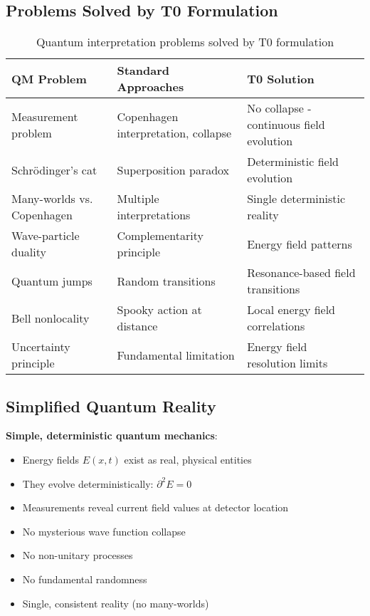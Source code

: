 \documentclass[12pt,a4paper]{article}
\newcommand{\Efield}{E}
\begin{document}
	\subsection{Problems Solved by T0 Formulation}
	
	\begin{table}[htbp]
		\centering
		\small
		\begin{tabular}{|p{4cm}|p{5cm}|p{6cm}|}
			\hline
			\textbf{QM Problem} & \textbf{Standard Approaches} & \textbf{T0 Solution} \\
			\hline
			Measurement problem & Copenhagen interpretation, collapse & No collapse - continuous field evolution \\
			\hline
			Schrödinger's cat & Superposition paradox & Deterministic field evolution \\
			\hline
			Many-worlds vs. Copenhagen & Multiple interpretations & Single deterministic reality \\
			\hline
			Wave-particle duality & Complementarity principle & Energy field patterns \\
			\hline
			Quantum jumps & Random transitions & Resonance-based field transitions \\
			\hline
			Bell nonlocality & Spooky action at distance & Local energy field correlations \\
			\hline
			Uncertainty principle & Fundamental limitation & Energy field resolution limits \\
			\hline
		\end{tabular}
		\caption{Quantum interpretation problems solved by T0 formulation}
	\end{table}
	
	\subsection{Simplified Quantum Reality}
	
	\begin{tcolorbox}[colback=green!5!white,colframe=green!75!black,title=T0 Quantum Reality]
		\textbf{Simple, deterministic quantum mechanics}:
		\begin{itemize}
			\item Energy fields $\Efield(x,t)$ exist as real, physical entities
			\item They evolve deterministically: $\partial^2 \Efield = 0$
			\item Measurements reveal current field values at detector location
			\item No mysterious wave function collapse
			\item No non-unitary processes
			\item No fundamental randomness
			\item Single, consistent reality (no many-worlds)
		\end{itemize}
	\end{tcolorbox}
	
\end{document}
